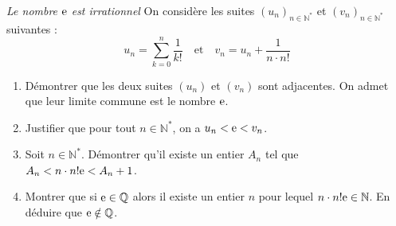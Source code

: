\documentclass[solutions]{exercices}
\begin{document}
\begin{exercice}[\di] \emph{Le nombre $\mathrm{e}$ est irrationnel}
	On considère les suites $(u_n)_{n\in\mathbb{N}^*}$ et $(v_n)_{n\in\mathbb{N}^*}$ suivantes :
	\[u_n=\sum_{k=0}^{n}\dfrac{1}{k!} \quad \text{et} \quad v_n=u_n+\frac1{n\cdot n!} \]
	\begin{enumerate}
		\item Démontrer que les deux suites $(u_n)$ et $(v_n)$ sont adjacentes. On admet que leur limite commune est le nombre $\mathrm{e}$.
		\item Justifier que pour tout $n\in\mathbb{N}^*$, on a $u_n<\mathrm{e}<v_n$.
		\item Soit $n\in\mathbb{N}^*$. Démontrer qu'il existe un entier $A_n$ tel que $A_n<n\cdot n!\mathrm{e}<A_n+1$.
		\item Montrer que si $\mathrm{e}\in\mathbb{Q}$ alors il existe un entier $n$ pour lequel $n\cdot n!\mathrm{e}\in\mathbb{N}$. En déduire que $\mathrm{e}\notin\mathbb{Q}$.
	\end{enumerate}
\end{exercice}
\end{document}
